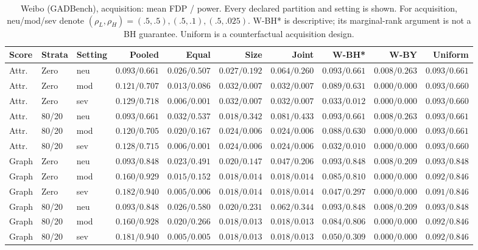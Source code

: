 \begin{table}[t]\centering\scriptsize\setlength{\tabcolsep}{3pt}
\caption{Weibo (GADBench), acquisition: mean FDP / power. Every declared partition and setting is shown. For acquisition, neu/mod/sev denote $(\rho_L,\rho_H)=(.5,.5),(.5,.1),(.5,.025)$. W-BH* is descriptive; its marginal-rank argument is not a BH guarantee. Uniform is a counterfactual acquisition design.}
\begin{tabular}{lllrrrrrrr}\toprule Score & Strata & Setting & Pooled & Equal & Size & Joint & W-BH* & W-BY & Uniform\\\midrule
Attr. & Zero & neu & $0.093/0.661$ & $0.026/0.507$ & $0.027/0.192$ & $0.064/0.260$ & $0.093/0.661$ & $0.008/0.263$ & $0.093/0.661$ \\
Attr. & Zero & mod & $0.121/0.707$ & $0.013/0.086$ & $0.032/0.007$ & $0.032/0.007$ & $0.089/0.631$ & $0.000/0.000$ & $0.093/0.660$ \\
Attr. & Zero & sev & $0.129/0.718$ & $0.006/0.001$ & $0.032/0.007$ & $0.032/0.007$ & $0.033/0.012$ & $0.000/0.000$ & $0.093/0.660$ \\
Attr. & 80/20 & neu & $0.093/0.661$ & $0.032/0.537$ & $0.018/0.342$ & $0.081/0.433$ & $0.093/0.661$ & $0.008/0.263$ & $0.093/0.661$ \\
Attr. & 80/20 & mod & $0.120/0.705$ & $0.020/0.167$ & $0.024/0.006$ & $0.024/0.006$ & $0.088/0.630$ & $0.000/0.000$ & $0.093/0.661$ \\
Attr. & 80/20 & sev & $0.128/0.715$ & $0.006/0.001$ & $0.024/0.006$ & $0.024/0.006$ & $0.032/0.010$ & $0.000/0.000$ & $0.093/0.660$ \\
Graph & Zero & neu & $0.093/0.848$ & $0.023/0.491$ & $0.020/0.147$ & $0.047/0.206$ & $0.093/0.848$ & $0.008/0.209$ & $0.093/0.848$ \\
Graph & Zero & mod & $0.160/0.929$ & $0.015/0.152$ & $0.018/0.014$ & $0.018/0.014$ & $0.085/0.810$ & $0.000/0.000$ & $0.092/0.846$ \\
Graph & Zero & sev & $0.182/0.940$ & $0.005/0.006$ & $0.018/0.014$ & $0.018/0.014$ & $0.047/0.297$ & $0.000/0.000$ & $0.091/0.846$ \\
Graph & 80/20 & neu & $0.093/0.848$ & $0.026/0.580$ & $0.020/0.231$ & $0.062/0.344$ & $0.093/0.848$ & $0.008/0.209$ & $0.093/0.848$ \\
Graph & 80/20 & mod & $0.160/0.928$ & $0.020/0.266$ & $0.018/0.013$ & $0.018/0.013$ & $0.084/0.806$ & $0.000/0.000$ & $0.092/0.846$ \\
Graph & 80/20 & sev & $0.181/0.940$ & $0.005/0.005$ & $0.018/0.013$ & $0.018/0.013$ & $0.050/0.309$ & $0.000/0.000$ & $0.092/0.846$ \\
\bottomrule\end{tabular}\end{table}